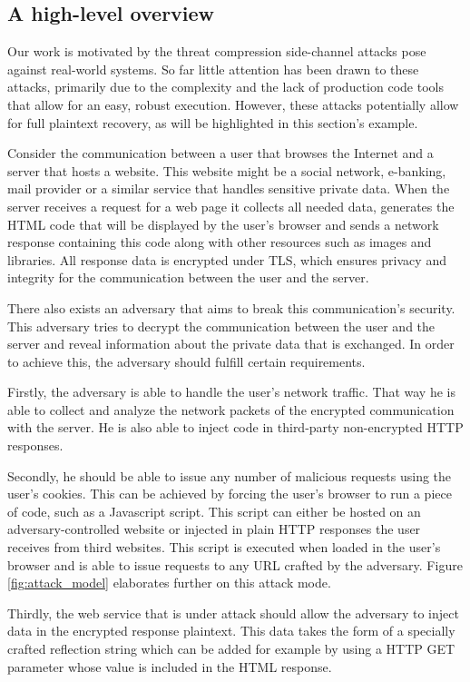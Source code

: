 \documentclass[conference, letterpaper, 10pt]{IEEEtran}
\begin{document}
\subsection{A high-level overview}\label{subsec:example}
Our work is motivated by the threat compression side-channel attacks pose
against real-world systems. So far little attention has been drawn to these
attacks, primarily due to the complexity and the lack of production code tools
that allow for an easy, robust execution. However, these attacks potentially
allow for full plaintext recovery, as will be highlighted in this section's
example.

Consider the communication between a user that browses the Internet and a server
that hosts a website. This website might be a social network, e-banking, mail
provider or a similar service that handles sensitive private data. When the
server receives a request for a web page it collects all needed data, generates
the HTML code that will be displayed by the user's browser and sends a network
response containing this code along with other resources such as images and
libraries. All response data is encrypted under TLS, which ensures privacy and
integrity for the communication between the user and the server.

There also exists an adversary that aims to break this communication's security.
This adversary tries to decrypt the communication between
the user and the server and reveal information about the private data that is
exchanged. In order to achieve this, the adversary should fulfill certain
requirements.

Firstly, the adversary is able to handle the user's network traffic. That way he
is able to collect and analyze the network packets of the encrypted
communication with the server. He is also able to inject code in third-party
non-encrypted HTTP responses.

Secondly, he should be able to issue any number of malicious requests using the
user's cookies. This can be achieved by forcing the user's browser to run a
piece of code, such as a Javascript script. This script can either be hosted on
an adversary-controlled website or injected in plain HTTP responses the user
receives from third websites. This script is executed when loaded in the user's
browser and is able to issue requests to any URL crafted by the adversary.
Figure \ref{fig:attack_model} elaborates further on this attack mode.

Thirdly, the web service that is under attack should allow the adversary to
inject data in the encrypted response plaintext. This data takes the form of a
specially crafted reflection string which can be added for example by using a
HTTP GET parameter whose value is included in the HTML response.
\end{document}
